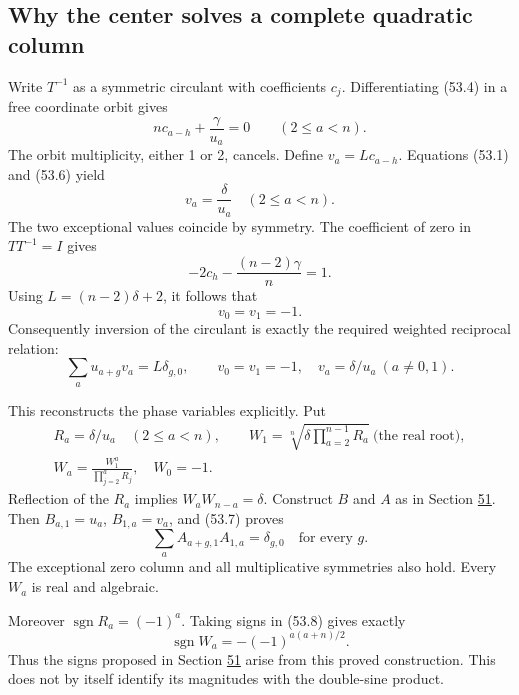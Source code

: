 \documentclass[11pt,reqno]{amsart}
\theoremstyle{plain}
\begin{document}
\subsection{Why the center solves a complete quadratic column}\label{sec:53.2}

Write \(T^{-1}\) as a symmetric circulant with coefficients \(c_j\).
Differentiating (53.4) in a free coordinate orbit gives
\begin{equation*}
 n c_{a-h}+\frac{\gamma}{u_a}=0\qquad(2\le a<n).
 \tag{53.6}
\end{equation*}
The orbit multiplicity, either 1 or 2, cancels. Define
\(v_a=Lc_{a-h}\). Equations (53.1) and (53.6) yield
\[
 v_a=\frac{\delta}{u_a}\quad(2\le a<n).
\]
The two exceptional values coincide by symmetry. The coefficient of
zero in \(TT^{-1}=I\) gives
\[
 -2c_h-\frac{(n-2)\gamma}{n}=1.
\]
Using \(L=(n-2)\delta+2\), it follows that
\[
 v_0=v_1=-1.
\]
Consequently inversion of the circulant is exactly the required
weighted reciprocal relation:
\begin{equation*}
 \boxed{\displaystyle
 \sum_a u_{a+g}v_a=L\delta_{g,0},\qquad
 v_0=v_1=-1,\quad v_a=\delta/u_a\ (a\ne0,1).
 }\tag{53.7}
\end{equation*}

This reconstructs the phase variables explicitly. Put
\begin{equation*}
 \begin{gathered}
 R_a=\delta/u_a\quad(2\le a<n),\qquad
 W_1=\sqrt[n]{\delta\prod_{a=2}^{n-1}R_a}\ \text{(the real root)},\\
 W_a=\frac{W_1^a}{\prod_{j=2}^aR_j},\quad W_0=-1.
 \end{gathered}
 \tag{53.8}
\end{equation*}
Reflection of the \(R_a\) implies \(W_aW_{n-a}=\delta\).
Construct \(B\) and \(A\) as in Section \hyperref[sec:51]{51}. Then
\(B_{a,1}=u_a\), \(B_{1,a}=v_a\), and (53.7) proves
\begin{equation*}
 \sum_a A_{a+g,1}A_{1,a}=\delta_{g,0}\quad\text{for every }g.
 \tag{53.9}
\end{equation*}
The exceptional zero column and all multiplicative symmetries also
hold. Every \(W_a\) is real and algebraic.

Moreover \(\operatorname{sgn}R_a=(-1)^a\). Taking signs in (53.8)
gives exactly
\begin{equation*}
 \operatorname{sgn}W_a=-(-1)^{a(a+n)/2}.
 \tag{53.10}
\end{equation*}
Thus the signs proposed in Section \hyperref[sec:51]{51} arise from this proved
construction. This does not by itself identify its magnitudes with
the double-sine product.
\end{document}
